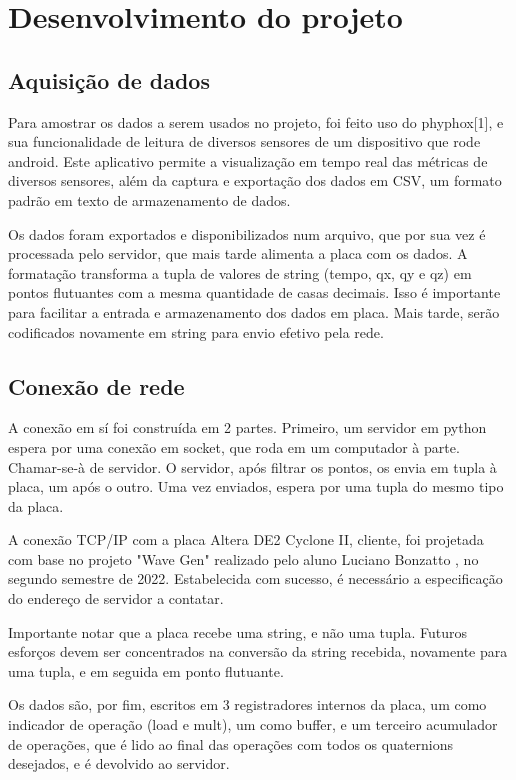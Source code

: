 \documentclass [12pt,oneside] {article}
\begin{document}
\newpage

\section{Desenvolvimento do projeto}

\subsection{Aquisição de dados}

	Para amostrar os dados a serem usados no projeto, foi feito
uso do phyphox[1], e sua funcionalidade de leitura de diversos
sensores de um dispositivo que rode android. Este aplicativo permite a
visualização em tempo real das métricas de diversos sensores, além da
captura e exportação dos dados em CSV, um formato padrão em texto de
armazenamento de dados.

	Os dados foram exportados e disponibilizados num arquivo, que
por sua vez é processada pelo servidor, que mais tarde alimenta a
placa com os dados. A formatação transforma a tupla de valores de
string (tempo, qx, qy e qz) em pontos flutuantes com a mesma quantidade de casas
decimais. Isso é importante para facilitar a entrada e armazenamento
dos dados em placa. Mais tarde, serão codificados novamente em string
para envio efetivo pela rede.

\subsection{Conexão de rede}

	A conexão em sí foi construída em 2 partes. Primeiro, um
servidor em python espera por uma conexão em socket, que roda em um
computador à parte. Chamar-se-à de servidor. O servidor, após filtrar
os pontos, os envia em tupla à placa, um após o outro. Uma vez
enviados, espera por uma tupla do mesmo tipo da placa.

	A conexão TCP/IP com a placa Altera DE2 Cyclone II, cliente, foi
projetada com base no projeto "Wave Gen" realizado pelo aluno Luciano Bonzatto
, no segundo semestre de 2022. Estabelecida com sucesso, é necessário
a especificação do endereço de servidor a contatar.

	Importante notar que a placa recebe uma string, e não uma
tupla. Futuros esforços devem ser concentrados na conversão da string
recebida, novamente para uma tupla, e em seguida em ponto flutuante.

	Os dados são, por fim, escritos em 3 registradores internos da
placa, um como indicador de operação (load e mult), um como buffer, e
um terceiro acumulador de operações, que é lido ao final das operações
com todos os quaternions desejados, e é devolvido ao servidor.
\end{document}
